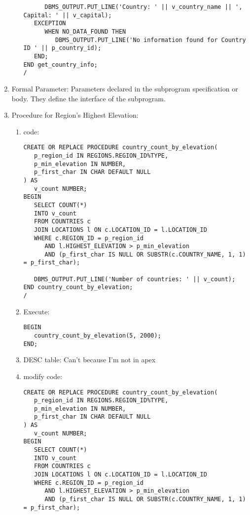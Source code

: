 \documentclass[11pt]{article}
\begin{document}
\begin{enumerate}
\begin{enumerate}
\begin{verbatim}
      DBMS_OUTPUT.PUT_LINE('Country: ' || v_country_name || ', Capital: ' || v_capital);
   EXCEPTION
      WHEN NO_DATA_FOUND THEN
         DBMS_OUTPUT.PUT_LINE('No information found for Country ID ' || p_country_id);
   END;
END get_country_info;
/
\end{verbatim}
\end{enumerate}

\item Formal Parameter: Parameters declared in the subprogram specification or body. They define the interface of the subprogram.

\item Procedure for Region's Highest Elevation:

\begin{enumerate}
\item code:
\begin{verbatim}
CREATE OR REPLACE PROCEDURE country_count_by_elevation(
   p_region_id IN REGIONS.REGION_ID%TYPE,
   p_min_elevation IN NUMBER,
   p_first_char IN CHAR DEFAULT NULL
) AS
   v_count NUMBER;
BEGIN
   SELECT COUNT(*)
   INTO v_count
   FROM COUNTRIES c
   JOIN LOCATIONS l ON c.LOCATION_ID = l.LOCATION_ID
   WHERE c.REGION_ID = p_region_id
      AND l.HIGHEST_ELEVATION > p_min_elevation
      AND (p_first_char IS NULL OR SUBSTR(c.COUNTRY_NAME, 1, 1) = p_first_char);

   DBMS_OUTPUT.PUT_LINE('Number of countries: ' || v_count);
END country_count_by_elevation;
/
\end{verbatim}

\item Execute:
\begin{verbatim}
BEGIN
   country_count_by_elevation(5, 2000);
END;
\end{verbatim}

\item DESC table: Can't because I'm not in apex

\item modify code:
\begin{verbatim}
CREATE OR REPLACE PROCEDURE country_count_by_elevation(
   p_region_id IN REGIONS.REGION_ID%TYPE,
   p_min_elevation IN NUMBER,
   p_first_char IN CHAR DEFAULT NULL
) AS
   v_count NUMBER;
BEGIN
   SELECT COUNT(*)
   INTO v_count
   FROM COUNTRIES c
   JOIN LOCATIONS l ON c.LOCATION_ID = l.LOCATION_ID
   WHERE c.REGION_ID = p_region_id
      AND l.HIGHEST_ELEVATION > p_min_elevation
      AND (p_first_char IS NULL OR SUBSTR(c.COUNTRY_NAME, 1, 1) = p_first_char);


\end{verbatim}
\end{enumerate}
\end{enumerate}
\end{document}
